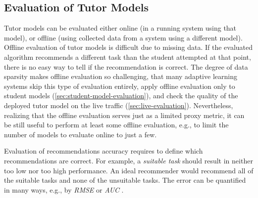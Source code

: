 \subsection{Evaluation of Tutor Models}
\label{tutors.evaluation}


Tutor models can be evaluated either online (in a running system using that model),
or offline (using collected data from a system using a different model).
Offline evaluation of tutor models is difficult due to missing data.
If the evaluated algorithm recommends a different task than the student attempted
at that point, there is no easy way to tell if the recommendation is correct. %
The degree of data sparsity makes offline evaluation so challenging,
that many adaptive learning systems skip this type of evaluation entirely,
apply offline evaluation only to student models (\cref{sec:student-model-evaluation}),
and check the quality of the deployed tutor model on the live traffic
(\cref{sec:live-evaluation}).
Nevertheless, realizing that the offline evaluation serves just as
a limited proxy metric,
it can be still useful to perform at least some offline evaluation,
e.g., to limit the number of models to evaluate online to just a few.

Evaluation of recommendations accuracy requires to define which
recommendations are correct. For example, a \emph{suitable task} should
result in neither too low nor too high performance.
An ideal recommender would recommend all of the suitable tasks and none of
the unsuitable tasks.
The error can be quantified in many ways, e.g., by \emph{RMSE} or \emph{AUC}
\cite[section\,8.3.2]{recsys}.

